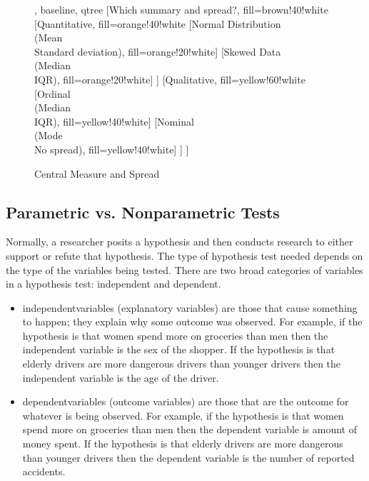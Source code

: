 \begin{figure}[H]
	\centering
	
	
	\begin{forest}, baseline, qtree
		[Which summary and spread?, fill=brown!40!white
			[{Quantitative}, fill=orange!40!white
				[{Normal Distribution\\(Mean\\Standard deviation)}, fill=orange!20!white]
				[{Skewed Data\\(Median\\IQR)}, fill=orange!20!white]
			]
			[{Qualitative}, fill=yellow!60!white
				[{Ordinal\\(Median\\IQR)}, fill=yellow!40!white]
				[{Nominal\\(Mode\\No spread)}, fill=yellow!40!white]
			]
		]
	\end{forest}
	
	\caption{Central Measure and Spread}
	\label{fig06.09}
\end{figure}

\subsection{Parametric vs. Nonparametric Tests}

Normally, a researcher posits a hypothesis and then conducts research to either support or refute that hypothesis. The type of hypothesis test needed depends on the type of the variables being tested. There are two broad categories of variables in a hypothesis test: independent and dependent.

\begin{itemize}
	\item \Glspl{independentvariable} (explanatory variables) are those that cause something to happen; they explain why some outcome was observed. For example, if the hypothesis is that women spend more on groceries than men then the independent variable is the sex of the shopper. If the hypothesis is that elderly drivers are more dangerous drivers than younger drivers then the independent variable is the age of the driver.

	\item \Glspl{dependentvariable} (outcome variables) are those that are the outcome for whatever is being observed. For example, if the hypothesis is that women spend more on groceries than men then the dependent variable is amount of money spent. If the hypothesis is that elderly drivers are more dangerous than younger drivers then the dependent variable is the number of reported accidents.
\end{itemize}

